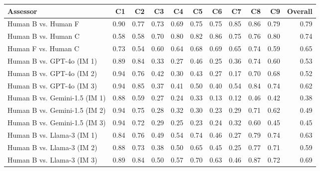 \begin{table*}[]
    \footnotesize
    \centering

\begin{tabular}{lrrrrrrrrrr}
\toprule
                            Assessor &   C1 &   C2 &   C3 &   C4 &   C5 &   C6 &   C7 &   C8 &   C9 &  Overall \\
\midrule \midrule
                             Human B vs. Human F & 0.90 & 0.77 & 0.73 & 0.69 & 0.75 & 0.75 & 0.85 & 0.86 & 0.79 &     0.79 \\
                             Human B vs. Human C & 0.58 & 0.58 & 0.70 & 0.80 & 0.82 & 0.86 & 0.75 & 0.76 & 0.80 &     0.74 \\
                             Human F vs. Human C & 0.73 & 0.54 & 0.60 & 0.64 & 0.68 & 0.69 & 0.65 & 0.74 & 0.59 &     0.65 \\ \midrule \midrule
                             
                 Human B vs. GPT-4o (IM 1) & 0.89 & 0.84 & 0.33 & 0.27 & 0.46 & 0.25 & 0.36 & 0.74 & 0.60 &     0.53 \\
                 Human B vs. GPT-4o (IM 2) & 0.94 & 0.76 & 0.42 & 0.30 & 0.43 & 0.27 & 0.17 & 0.70 & 0.68 &     0.52 \\
                 Human B vs. GPT-4o (IM 3) & 0.94 & 0.85 & 0.37 & 0.41 & 0.50 & 0.40 & 0.54 & 0.84 & 0.74 &     0.62 \\ [0.15cm]
                 
             Human B vs. Gemini-1.5 (IM 1) & 0.88 & 0.59 & 0.27 & 0.24 & 0.33 & 0.13 & 0.12 & 0.46 & 0.42 &     0.38 \\
             Human B vs. Gemini-1.5 (IM 2) & 0.94 & 0.75 & 0.28 & 0.32 & 0.30 & 0.23 & 0.29 & 0.71 & 0.62 &     0.49 \\
             Human B vs. Gemini-1.5 (IM 3) & 0.94 & 0.72 & 0.29 & 0.25 & 0.23 & 0.24 & 0.32 & 0.60 & 0.45 &     0.45 \\ [0.15cm]
             
                Human B vs. Llama-3 (IM 1) & 0.84 & 0.76 & 0.49 & 0.54 & 0.74 & 0.46 & 0.27 & 0.79 & 0.74 &     0.63 \\
                Human B vs. Llama-3 (IM 2) & 0.88 & 0.73 & 0.38 & 0.50 & 0.65 & 0.45 & 0.25 & 0.77 & 0.71 &     0.59 \\ 
                Human B vs. Llama-3 (IM 3) & 0.89 & 0.84 & 0.50 & 0.57 & 0.70 & 0.63 & 0.46 & 0.87 & 0.72 &     0.69 \\ \midrule
                

\end{tabular}
\end{table*}
